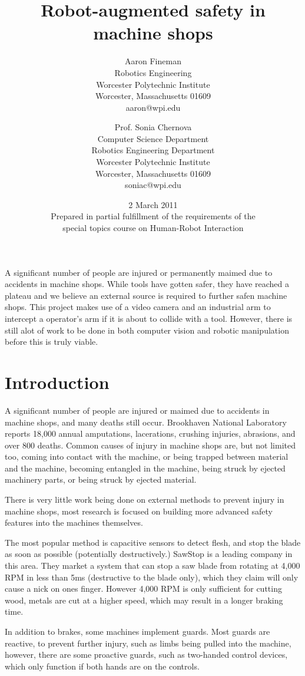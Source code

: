 \documentclass[12pt]{article}
\title{Robot-augmented safety in machine shops\\}
\author{
	Aaron Fineman\\
	\small{Robotics Engineering}\\
	\small{Worcester Polytechnic Institute}\\
	\small{Worcester, Massachusetts 01609}\\
	\small{aaron@wpi.edu}
	\and
	Prof. Sonia Chernova\\
	\small{Computer Science Department}\\
	\small{Robotics Engineering Department}\\
	\small{Worcester Polytechnic Institute}\\
	\small{Worcester, Massachusetts 01609}\\
	\small{soniac@wpi.edu}
}
\date{2 March 2011\\\small{Prepared in partial fulfillment of the requirements of the\\ special topics course on Human-Robot Interaction}}
\begin{document}
\maketitle
\newpage

\abstract
A significant number of people are injured or permanently maimed due to accidents in machine shops. While tools have gotten safer, they have reached a plateau and we believe an external source is required to further safen machine shops. This project makes use of a video camera and an industrial arm to intercept a operator's arm if it is about to collide with a tool. However, there is still alot of work to be done in both computer vision and robotic manipulation before this is truly viable.

\section{Introduction}
A significant number of people are injured or maimed due to accidents in machine shops, and many deaths still occur. Brookhaven National Laboratory reports 18,000 annual amputations, lacerations, crushing injuries, abrasions, and over 800 deaths\cite{BNL:safety}. Common causes of injury in machine shops are, but not limited too, coming into contact with the machine, or being trapped between material and the machine, becoming entangled in the machine, being struck by ejected machinery parts, or being struck by ejected material\cite{HKUST:safety}.

There is very little work being done on external methods to prevent injury in machine shops, most research is focused on building more advanced safety features into the machines themselves.

The most popular method is capacitive sensors to detect flesh, and stop the blade as soon as possible (potentially destructively.) SawStop is a leading company in this area. They market a system that can stop a saw blade from rotating at 4,000 RPM in less than 5ms (destructive to the blade only), which they claim will only cause a nick on ones finger\cite{sawstop}. However 4,000 RPM is only sufficient for cutting wood, metals are cut at a higher speed, which may result in a longer braking time.

In addition to brakes, some machines implement guards\cite{HKUST:safety}. Most guards are reactive, to prevent further injury, such as limbs being pulled into the machine, however, there are some proactive guards, such as two-handed control devices, which only function if both hands are on the controls.
\end{document}
